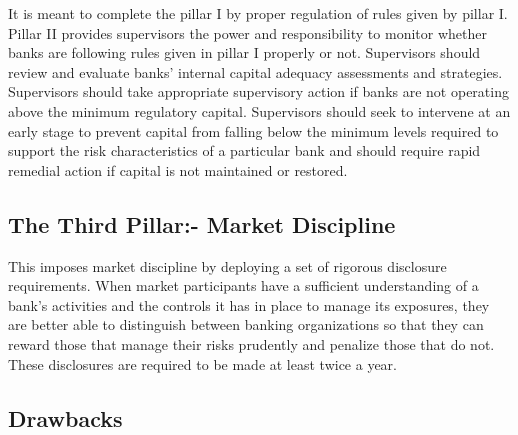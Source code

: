 \documentclass[11pt]{article}
\numberwithin{equation}{section}
\begin{document}
It is meant to complete the pillar I by proper regulation of rules given by pillar I. Pillar II provides supervisors the power and responsibility to monitor whether banks are following rules given in pillar I properly or not. Supervisors should review and evaluate banks’ internal capital adequacy assessments and strategies. Supervisors should take appropriate supervisory action if banks are not operating above the minimum regulatory capital. Supervisors should seek to intervene at an early stage to prevent capital from falling below the minimum levels required to support the risk characteristics of a particular bank and should require rapid remedial action if capital is not maintained or restored. 


\subsection{The Third Pillar:- Market Discipline}
\medskip

This imposes market discipline by deploying a set of rigorous disclosure requirements. When market participants have a sufficient understanding of a bank's activities and the controls it has in place to manage its exposures, they are better able to distinguish between banking organizations so that they can reward those that manage their risks prudently and penalize those that do not. These disclosures are required to be made at least twice a year. 

\subsection{Drawbacks}
\medskip
\end{document}
